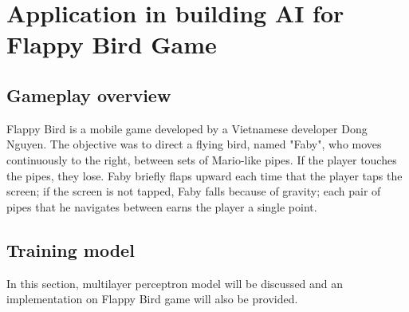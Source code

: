 \documentclass[conference]{IEEEtran}
\begin{document}
\section{Application in building AI for Flappy Bird Game}
\subsection{Gameplay overview}
Flappy Bird is a mobile game developed by a Vietnamese developer Dong Nguyen. The objective was to direct a flying bird, named "Faby", who moves continuously to the right, between sets of Mario-like pipes. If the player touches the pipes, they lose. Faby briefly flaps upward each time that the player taps the screen; if the screen is not tapped, Faby falls because of gravity; each pair of pipes that he navigates between earns the player a single point.
\subsection{Training model}
In this section, multilayer perceptron model will be discussed and an implementation on Flappy Bird game will also be provided.
\end{document}
